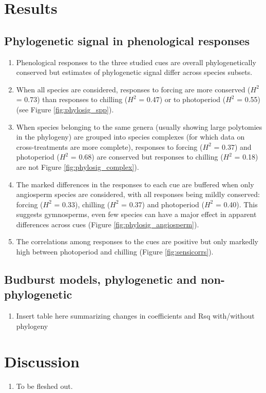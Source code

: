 \documentclass{article}\usepackage[]{graphicx}\usepackage[]{color}
\begin{document}
\section*{Results}
\subsection*{Phylogenetic signal in phenological responses}
\begin{enumerate}
\item Phenological responses to the three studied cues are overall phylogenetically conserved but estimates of phylogenetic signal differ across species subsets.
\item When all species are considered, responses to forcing are more conserved ($H^{2}$ = 0.73) than responses to chilling ($H^{2}$ = 0.47) or to photoperiod ($H^{2}$ = 0.55) (see Figure \ref{fig:phylosig_spp}).  
\item When species belonging to the same genera (usually showing large polytomies in the phylogeny) are grouped into species complexes (for which data on cross-treatments are more complete), responses to forcing ($H^{2}$ = 0.37) and photoperiod ($H^{2}$ = 0.68) are conserved but responses to chilling ($H^{2}$ = 0.18) are not Figure \ref{fig:phylosig_complex}).  
\item The marked differences in the responses to each cue are buffered when only angiosperm species are considered, with all responses being mildly conserved: forcing ($H^{2}$ = 0.33), chilling ($H^{2}$ = 0.37) and photoperiod ($H^{2}$ = 0.40). This suggests gymnosperms, even few species can have a major  effect in apparent differences across cues (Figure \ref{fig:phylosig_angiosperm}). 
\item The correlations among responses to the cues are positive but only markedly high between photoperiod and chilling (Figure \ref{fig:sensicorrs}).
\end{enumerate}


\subsection*{Budburst models, phylogenetic and non-phylogenetic}
\begin{enumerate}
\item Insert table here summarizing changes in coefficients and Rsq with/without phylogeny
\end{enumerate}




\section*{Discussion}
\begin{enumerate}
\item To be fleshed out.
  

\end{enumerate}
  
\end{document}
